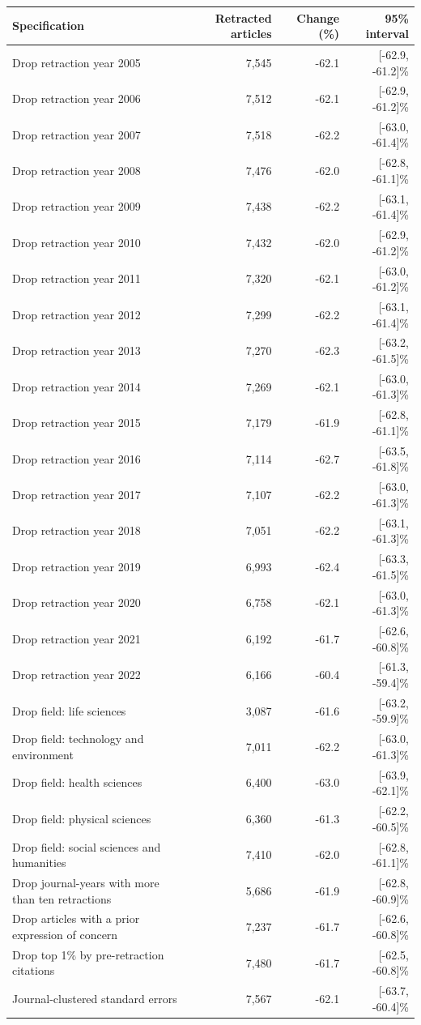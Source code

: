 
\begin{tabular}[t]{lrrr}
\toprule
Specification & Retracted articles & Change (\%) & 95\% interval\\
\midrule
Drop retraction year 2005 & 7,545 & -62.1 & {}[-62.9, -61.2]\%\\
Drop retraction year 2006 & 7,512 & -62.1 & {}[-62.9, -61.2]\%\\
Drop retraction year 2007 & 7,518 & -62.2 & {}[-63.0, -61.4]\%\\
Drop retraction year 2008 & 7,476 & -62.0 & {}[-62.8, -61.1]\%\\
Drop retraction year 2009 & 7,438 & -62.2 & {}[-63.1, -61.4]\%\\
Drop retraction year 2010 & 7,432 & -62.0 & {}[-62.9, -61.2]\%\\
Drop retraction year 2011 & 7,320 & -62.1 & {}[-63.0, -61.2]\%\\
Drop retraction year 2012 & 7,299 & -62.2 & {}[-63.1, -61.4]\%\\
Drop retraction year 2013 & 7,270 & -62.3 & {}[-63.2, -61.5]\%\\
Drop retraction year 2014 & 7,269 & -62.1 & {}[-63.0, -61.3]\%\\
Drop retraction year 2015 & 7,179 & -61.9 & {}[-62.8, -61.1]\%\\
Drop retraction year 2016 & 7,114 & -62.7 & {}[-63.5, -61.8]\%\\
Drop retraction year 2017 & 7,107 & -62.2 & {}[-63.0, -61.3]\%\\
Drop retraction year 2018 & 7,051 & -62.2 & {}[-63.1, -61.3]\%\\
Drop retraction year 2019 & 6,993 & -62.4 & {}[-63.3, -61.5]\%\\
Drop retraction year 2020 & 6,758 & -62.1 & {}[-63.0, -61.3]\%\\
Drop retraction year 2021 & 6,192 & -61.7 & {}[-62.6, -60.8]\%\\
Drop retraction year 2022 & 6,166 & -60.4 & {}[-61.3, -59.4]\%\\
Drop field: life sciences & 3,087 & -61.6 & {}[-63.2, -59.9]\%\\
Drop field: technology and environment & 7,011 & -62.2 & {}[-63.0, -61.3]\%\\
Drop field: health sciences & 6,400 & -63.0 & {}[-63.9, -62.1]\%\\
Drop field: physical sciences & 6,360 & -61.3 & {}[-62.2, -60.5]\%\\
Drop field: social sciences and humanities & 7,410 & -62.0 & {}[-62.8, -61.1]\%\\
Drop journal-years with more than ten retractions & 5,686 & -61.9 & {}[-62.8, -60.9]\%\\
Drop articles with a prior expression of concern & 7,237 & -61.7 & {}[-62.6, -60.8]\%\\
Drop top 1\% by pre-retraction citations & 7,480 & -61.7 & {}[-62.5, -60.8]\%\\
Journal-clustered standard errors & 7,567 & -62.1 & {}[-63.7, -60.4]\%\\
\bottomrule
\end{tabular}
